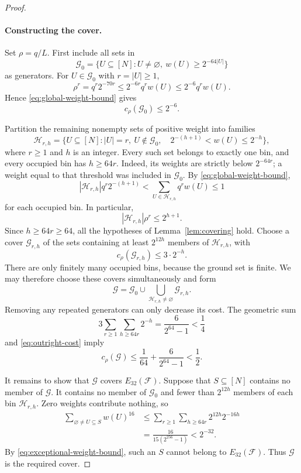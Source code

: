 \begin{proof}
\paragraph{Constructing the cover.}
Set $\rho=q/L$. First include all sets in
\[
 \mathcal G_0=
 \{U\subseteq[N]:U\ne\varnothing,\ w(U)\ge2^{-64|U|}\}
\]
as generators. For $U\in\mathcal G_0$ with $r=|U|\ge1$,
\[
 \rho^r=q^r2^{-70r}
 \le2^{-6r}q^r w(U)
 \le2^{-6}q^r w(U).
\]
Hence \eqref{eq:global-weight-bound} gives
\begin{equation}\label{eq:outright-cost}
 c_\rho(\mathcal G_0)\le2^{-6}.
\end{equation}

Partition the remaining nonempty sets of positive weight into families
\[
 \mathcal H_{r,h}=
 \bigl\{U\subseteq[N]:|U|=r,\ U\notin\mathcal G_0,
 \quad 2^{-(h+1)}<w(U)\le2^{-h}\bigr\},
\]
where $r\ge1$ and $h$ is an integer. Every such set belongs to exactly
one bin, and every occupied bin has $h\ge64r$. Indeed, its weights are
strictly below $2^{-64r}$; a weight equal to that threshold was included
in $\mathcal G_0$. By \eqref{eq:global-weight-bound},
\[
 |\mathcal H_{r,h}|q^r2^{-(h+1)}
 <\sum_{U\in\mathcal H_{r,h}}q^r w(U)\le1
\]
for each occupied bin. In particular,
\[
 |\mathcal H_{r,h}|\rho^r\le2^{h+1}.
\]
Since $h\ge64r\ge64$, all the hypotheses of
Lemma~\ref{lem:covering} hold. Choose a cover $\mathcal G_{r,h}$ of
the sets containing at least $2^{12h}$ members of $\mathcal H_{r,h}$,
with
\[
 c_\rho(\mathcal G_{r,h})\le3\cdot2^{-h}.
\]
There are only finitely many occupied bins, because the ground set is
finite. We may therefore choose these covers simultaneously and form
\[
 \mathcal G=\mathcal G_0\cup\bigcup_{\mathcal H_{r,h}\ne\varnothing}
 \mathcal G_{r,h}.
\]
Removing any repeated generators can only decrease its cost. The
geometric sum
\begin{equation}\label{eq:bin-cost-sum}
 3\sum_{r\ge1}\sum_{h\ge64r}2^{-h}
 =\frac{6}{2^{64}-1}<\frac14
\end{equation}
and \eqref{eq:outright-cost} imply
\[
 c_\rho(\mathcal G)
 \le\frac1{64}+\frac{6}{2^{64}-1}<\frac12.
\]

It remains to show that $\mathcal G$ covers $E_{32}(\mathcal F)$.
Suppose that $S\subseteq[N]$ contains no member of $\mathcal G$.
It contains no member of $\mathcal G_0$ and fewer than $2^{12h}$
members of each bin $\mathcal H_{r,h}$. Zero weights contribute nothing,
so
\begin{equation}\label{eq:bin-power-sum}
 \begin{aligned}
 \sum_{\varnothing\ne U\subseteq S}w(U)^{16}
 &\le\sum_{r\ge1}\sum_{h\ge64r}2^{12h}2^{-16h}\\
 &=\frac{16}{15(2^{256}-1)}<2^{-32}.
 \end{aligned}
\end{equation}
By \eqref{eq:exceptional-weight-bound}, such an $S$ cannot belong to
$E_{32}(\mathcal F)$. Thus $\mathcal G$ is the required cover.
\end{proof}

